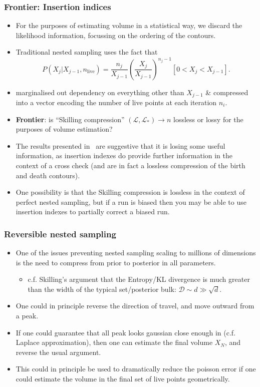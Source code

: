 \documentclass[aspectratio=169]{beamer}
\begin{document}
\begin{frame}
    \frametitle{Frontier: Insertion indices}

\begin{itemize}
    \item For the purposes of estimating volume in a statistical way, we discard the likelihood information, focussing on the ordering of the contours. 
    \item Traditional nested sampling uses the fact that
\[
    P(X_j|X_{j-1}, n_\mathrm{live}) = \frac{n_j}{X_{j-1}}\left( \frac{X_j}{X_{j-1}} \right)^{n_j-1} [0<X_j<X_{j-1}].
    \]
\item marginalised out dependency on everything other than $X_{j-1}$ \&  compressed into a vector encoding the number of live points at each iteration $n_i$. 
\item  \textbf{Frontier}: is ``Skilling compression'' $(\mathcal{L},\mathcal{L}_*)\to n$ lossless or lossy for the purposes of volume estimation?
\item The results presented in~ are suggestive that it is losing some useful information, as insertion indexes do provide further information in the context of a cross check (and are in fact a lossless compression of the birth and death contours). 
\item One possibility is that the Skilling compression is lossless in the context of perfect nested sampling, but if a run is biased then you may be able to use insertion indexes to partially correct a biased run. 
\end{itemize}
\end{frame}

\begin{frame}
    \frametitle{Reversible nested sampling}
    \begin{itemize}
        \item One of the issues preventing nested sampling scaling to millions of dimensions is the need to compress from prior to posterior in all parameters.
            \begin{itemize}
                \item c.f. Skilling's argument that the Entropy/KL divergence is much greater than the width of the typical set/posterior bulk: $\mathcal{D}\sim d \gg \sqrt{d}$.
            \end{itemize}
        \item One could in principle reverse the direction of travel, and move outward from a peak.
        \item If one could guarantee that all peak looks gaussian close enough in (c.f. Laplace approximation), then one can estimate the final volume $X_N$, and reverse the usual argument.
        \item This could in principle be used to dramatically reduce the poisson error if one could estimate the volume in the final set of live points geometrically.
    \end{itemize}
\end{frame}
\end{document}
